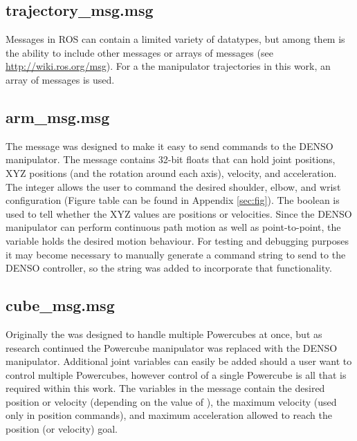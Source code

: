 \subsection{trajectory\_msg.msg}
\label{sec:trajmsg}
Messages in ROS can contain a limited variety of datatypes, but among them is the ability to include other messages or arrays of messages (see \url{http://wiki.ros.org/msg}). For a the manipulator trajectories in this work, an array of  messages is used.\\

\subsection{arm\_msg.msg}
The  message was designed to make it easy to send commands to the DENSO manipulator. The message contains 32-bit floats that can hold joint positions, XYZ positions (and the rotation around each axis), velocity, and acceleration. The  integer allows the user to command the desired shoulder, elbow, and wrist configuration (Figure table can be found in Appendix \ref{sec:fig}). The  boolean is used to tell  whether the XYZ values are positions or velocities. Since the DENSO manipulator can perform continuous path motion as well as point-to-point, the  variable holds the desired motion behaviour. For testing and debugging purposes it may become necessary to manually generate a command string to send to the DENSO controller, so the string  was added to incorporate that functionality.\\

\subsection{cube\_msg.msg}
Originally the  was designed to handle multiple Powercubes at once, but as research continued the Powercube manipulator was replaced with the DENSO manipulator. Additional joint variables can easily be added should a user want to control multiple Powercubes, however control of a single Powercube is all that is required within this work. The variables in the  message contain the desired position or velocity (depending on the value of ), the maximum velocity (used only in position commands), and maximum acceleration allowed to reach the position (or velocity) goal.\\

